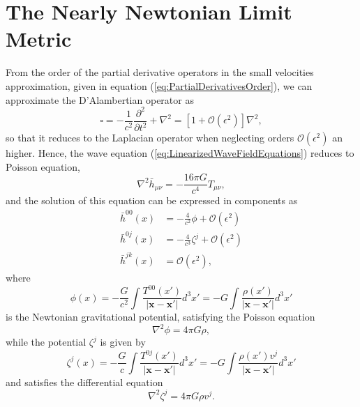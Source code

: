 \section{The Nearly Newtonian Limit Metric}\label{sec:NearlyNewtonianLimit}

From the order of the partial derivative operators in the small velocities approximation, given in equation (\ref{eq:PartialDerivativesOrder}), we can approximate the D'Alambertian operator as
\begin{equation}
\square = - \frac{1}{c^2} \frac{\partial^2}{\partial t^2} + \nabla^2 = \left[ 1 + \mathcal{O}(\epsilon^2 ) \right] \nabla^2,
\end{equation}
so that it reduces to the Laplacian operator when neglecting orders $\mathcal{O} (\epsilon^2 )$ an higher. Hence, the wave equation (\ref{eq:LinearizedWaveFieldEquations}) reduces to Poisson equation,
\begin{equation}
\nabla^2 \bar{h}_{\mu \nu}  = - \frac{16 \pi G}{c^4} T_{\mu \nu},
\end{equation}
and the solution of this equation can be expressed in components as
\begin{subequations}
\begin{align}
\bar{h}^{00} (x) &= -\frac{4}{c^2} \phi + \mathcal{O} \left( \epsilon^2 \right)\\
\bar{h}^{0j} (x) &=  - \frac{4}{c^3} \zeta^j + \mathcal{O} \left( \epsilon^2 \right)  \\
\bar{h}^{jk} (x) &= \mathcal{O} \left( \epsilon^2 \right) ,
\end{align}
\end{subequations}
where
\begin{equation}
\phi (x) = -\frac{G}{c^2} \int \frac{T^{00} (x')}{\left| \textbf{x} - \textbf{x}' \right|} d^3 x' = -G \int \frac{\rho (x')}{\left| \textbf{x} - \textbf{x}' \right|} d^3 x'  
\end{equation}
is the Newtonian gravitational potential, satisfying the Poisson equation
\begin{equation}
\nabla^2 \phi = 4\pi G \rho,
\end{equation}
while the potential $\zeta^j$ is given by
\begin{equation}
\zeta^j (x) = -\frac{G}{c} \int \frac{T^{0j} (x')}{\left| \textbf{x} - \textbf{x}' \right|} d^3 x' = -G \int \frac{\rho (x') v^j }{\left| \textbf{x} - \textbf{x}' \right|} d^3 x'  
\end{equation}
and satisfies the differential equation
\begin{equation}
\nabla^2 \zeta^j = 4\pi G \rho v^j.
\end{equation}

